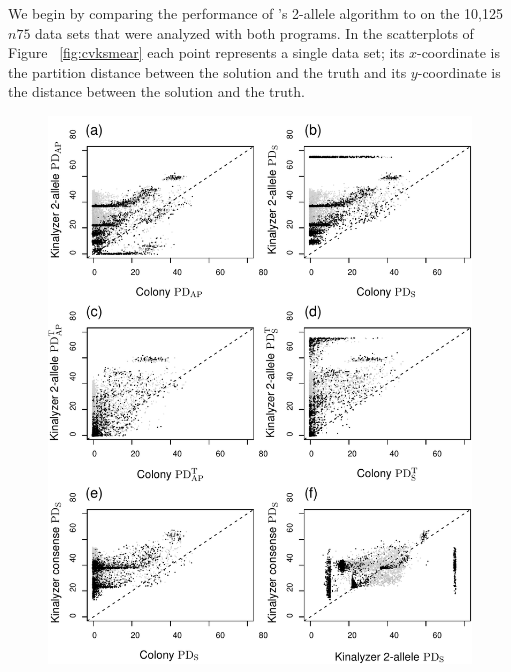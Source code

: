 We begin by comparing the performance of  \kinalyzer{}'s 2-allele algorithm to \colony{} on the 10,125 
$n75$ data sets that were analyzed with both programs.  In the scatterplots of Figure~
\ref{fig:cvksmear} each point represents a single data set; its $x$-coordinate is the partition 
distance between the \colony{} solution and the truth and its $y$-coordinate is the distance between 
the \kinalyzer{} solution and the truth.


\begin{figure}
\begin{center}
\includegraphics[width=.8\textwidth]{images/various_kin_smear.pdf}  %
\end{center}
\newcommand{\cvksmearcaption}{Scatterplots assessing performance of \kinalyzer{}.  {\em a}--{\em d} present comparisons of 
\colony{} versus \kinalyzer{}'s 2-allele algorithm for 10,125 simulated data sets, showing values of $
\W$, $\PDS$, $\WT$, and $\PDST$, respectively.  Thus, {\em b} and {\em d} penalize \kinalyzer{} for 
solutions that are not partitions, and {\em c} and {\em d} use the trimmed partition distances to 
}
\end{figure}
